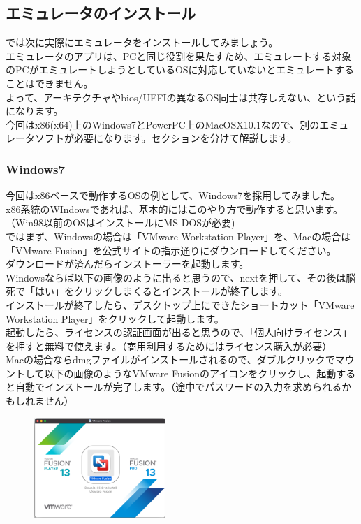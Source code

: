 \documentclass[b5paper,9pt,platex,dvipdfmx]{jsarticle}
\begin{document}
\begin{multicols*}{3}
\section{エミュレータのインストール}
では次に実際にエミュレータをインストールしてみましょう。\\
エミュレータのアプリは、PCと同じ役割を果たすため、エミュレートする対象のPCがエミュレートしようとしているOSに対応していないとエミュレートすることはできません。\\
よって、アーキテクチャやbios/UEFIの異なるOS同士は共存しえない、という話になります。\\
今回はx86(x64)上のWindows7とPowerPC上のMacOSX10.1なので、別のエミュレータソフトが必要になります。セクションを分けて解説します。
\subsubsection{Windows7}
今回はx86ベースで動作するOSの例として、Windows7を採用してみました。\\
x86系統のWIndowsであれば、基本的にはこのやり方で動作すると思います。（Win98以前のOSはインストールにMS-DOSが必要)\\
ではまず、Windowsの場合は「VMware Workstation Player」を、Macの場合は「VMware Fusion」を公式サイトの指示通りにダウンロードしてください。\\
ダウンロードが済んだらインストーラーを起動します。\\
Windowsならば以下の画像のように出ると思うので、nextを押して、その後は脳死で「はい」をクリックしまくるとインストールが終了します。\\
インストールが終了したら、デスクトップ上にできたショートカット「VMware Workstation Player」をクリックして起動します。\\
起動したら、ライセンスの認証画面が出ると思うので、「個人向けライセンス」を押すと無料で使えます。（商用利用するためにはライセンス購入が必要）\\
Macの場合ならdmgファイルがインストールされるので、ダブルクリックでマウントして以下の画像のようなVMware Fusionのアイコンをクリックし、起動すると自動でインストールが完了します。（途中でパスワードの入力を求められるかもしれません）\\
\begin{figure}[H]
  \centering
  \includegraphics[width=5cm]{1.png}

\end{figure}
\end{multicols*}
\end{document}
